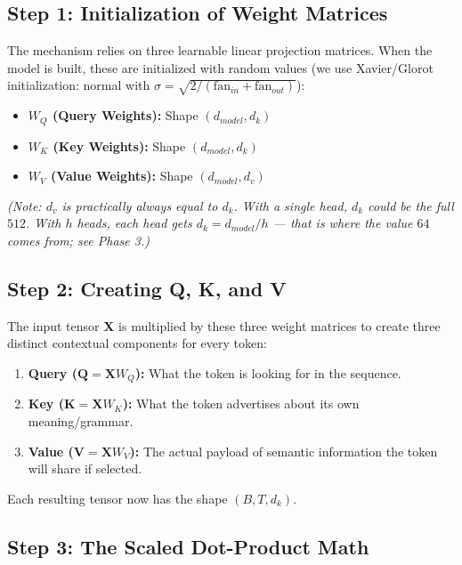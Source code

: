 \documentclass[11pt,a4paper,oneside]{report}
\providecommand{\tightlist}{\setlength{\itemsep}{0pt}\setlength{\parskip}{0pt}}
\begin{document}
\subsection{Step 1: Initialization of Weight Matrices}\label{step-1-initialization-of-weight-matrices}

The mechanism relies on three learnable linear projection matrices. When the model is built, these are initialized with random values (we use Xavier/Glorot initialization: normal with \(\sigma = \sqrt{2 / (\text{fan}_{in} + \text{fan}_{out})}\)):

\begin{itemize}
\tightlist
\item
  \textbf{\(W_Q\) (Query Weights):} Shape \((d_{model}, d_k)\)
\item
  \textbf{\(W_K\) (Key Weights):} Shape \((d_{model}, d_k)\)
\item
  \textbf{\(W_V\) (Value Weights):} Shape \((d_{model}, d_v)\)
\end{itemize}

\emph{(Note: \(d_v\) is practically always equal to \(d_k\). With a single head, \(d_k\) could be the full \(512\). With \(h\) heads, each head gets \(d_k = d_{model}/h\) --- that is where the value \(64\) comes from; see Phase 3.)}

\subsection{Step 2: Creating Q, K, and V}\label{step-2-creating-q-k-and-v}

The input tensor \(\mathbf{X}\) is multiplied by these three weight matrices to create three distinct contextual components for every token:

\begin{enumerate}
\def\labelenumi{\arabic{enumi}.}
\tightlist
\item
  \textbf{Query (\(\mathbf{Q} = \mathbf{X} W_Q\)):} What the token is looking for in the sequence.
\item
  \textbf{Key (\(\mathbf{K} = \mathbf{X} W_K\)):} What the token advertises about its own meaning/grammar.
\item
  \textbf{Value (\(\mathbf{V} = \mathbf{X} W_V\)):} The actual payload of semantic information the token will share if selected.
\end{enumerate}

Each resulting tensor now has the shape \((B, T, d_k)\).

\subsection{Step 3: The Scaled Dot-Product Math}\label{step-3-the-scaled-dot-product-math}
\end{document}
